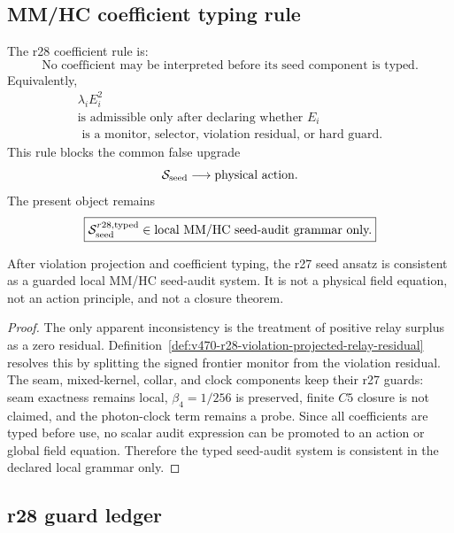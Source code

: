 \subsection{MM/HC coefficient typing rule}
\label{subsec:v470-r28-mmhc-coefficient-typing-rule}

The r28 coefficient rule is:
\[
\boxed{
\text{No coefficient may be interpreted before its seed component is typed.}
}
\]
Equivalently,
\[
\boxed{
\begin{gathered}
\lambda_i E_i^2
\\\text{is admissible only after declaring whether }E_i
\\
\text{ is a monitor, selector, violation residual, or hard guard.}
\end{gathered}
}
\]
This rule blocks the common false upgrade
\[
\mathcal S_{\rm seed}\longrightarrow\text{physical action}.
\]
The present object remains
\[
\boxed{
\mathcal S_{\rm seed}^{r28,\rm typed}
\in
\text{local MM/HC seed-audit grammar only.}
}
\]

\begin{theoremlet}
\label{thmlet:v470-r28-seed-consistency-coefficient-typing}
After violation projection and coefficient typing, the r27 seed ansatz is
consistent as a guarded local MM/HC seed-audit system.  It is not a physical
field equation, not an action principle, and not a closure theorem.
\end{theoremlet}

\begin{proof}
The only apparent inconsistency is the treatment of positive relay surplus as a
zero residual.  Definition~\ref{def:v470-r28-violation-projected-relay-residual}
resolves this by splitting the signed frontier monitor from the violation
residual.  The seam, mixed-kernel, collar, and clock components keep their r27
guards: seam exactness remains local, \(\beta_4=1/256\) is preserved, finite
\(C5\) closure is not claimed, and the photon-clock term remains a probe.  Since
all coefficients are typed before use, no scalar audit expression can be promoted
to an action or global field equation.  Therefore the typed seed-audit system is
consistent in the declared local grammar only.
\end{proof}

\subsection{r28 guard ledger}
\label{subsec:v470-r28-guard-ledger}


